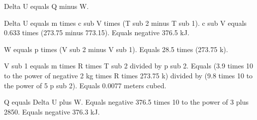 Delta U equals Q minus W.  

Delta U equals m times c sub V times (T sub 2 minus T sub 1).  
c sub V equals 0.633 times (273.75 minus 773.15).  
Equals negative 376.5 kJ.  

W equals p times (V sub 2 minus V sub 1).  
Equals 28.5 times (273.75 k).  

V sub 1 equals m times R times T sub 2 divided by p sub 2.  
Equals (3.9 times 10 to the power of negative 2 kg times R times 273.75 k) divided by (9.8 times 10 to the power of 5 p sub 2).  
Equals 0.0077 meters cubed.  

Q equals Delta U plus W.  
Equals negative 376.5 times 10 to the power of 3 plus 2850.  
Equals negative 376.3 kJ.
